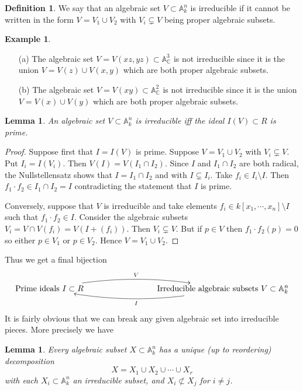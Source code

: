 \documentclass [12pt,oneside,a4paper,mathscr]{amsart}
\newtheorem{lemma}[thm]{Lemma}
\theoremstyle{definition}
\newtheorem{defn}[thm]{Definition}
\newtheorem{example}[thm]{Example}
\newcommand {\A}{\mathbb A}
\newcommand {\C}{\mathbb C}
\begin{document}
\begin{defn}We say that an algebraic set $V\subset \A^n_k$  is irreducible if it cannot be written in the form $V=V_1\cup V_2$ with $V_i\subsetneq V$ being proper algebraic subsets.\end{defn}


\begin{example}
\begin{itemize}
\item[(a)] The algebraic  set $V=V(xz,yz)\subset \A^3_\C$ is not irreducible since it is the union $V=V(z)\cup V(x,y)$ which are both proper algebraic subsets.\smallskip
\item[(b)] The algebraic set $V=V(xy)\subset \A^2_\C$ is not irreducible since it is the union $V=V(x)\cup V(y)$ which are both proper algebraic subsets.\smallskip
\end{itemize}
\end{example}

\begin{lemma}
An algebraic set $V\subset \A^n_k$ is irreducible iff the ideal $I(V)\subset R$ is prime.
\end{lemma}

\begin{proof}
Suppose first that $I=I(V)$ is prime. Suppose $V=V_1\cup V_2$ with $V_i\subsetneq V$. Put $I_i=I(V_i)$. Then $V(I)=V(I_1\cap I_2)$. Since $I$ and $I_1\cap I_2$ are both radical, the Nullstellensatz shows that $I=I_1\cap I_2$ and  with $I\subsetneq I_i$. 
 Take $f_i\in I_i\setminus I$. Then $f_1 \cdot f_2\in I_1\cap I_2=I$ contradicting the statement that $I$ is prime.

Conversely, suppose that $V$ is irreducible and take elements $f_i\in k[x_1,\cdots,x_n]\setminus  I$ such that $f_1\cdot f_2\in I$. Consider the algebraic subsets $V_i=V\cap V(f_i)=V(I+(f_i))$. Then $V_i\subsetneq V$. But if $p\in V$ then $f_1\cdot f_2(p)=0$ so either $p\in V_1$ or $p\in V_2$. Hence $V=V_1\cup V_2$. 
\end{proof}

Thus we get a final bijection
\[\xymatrix{ {\text{Prime ideals }I\subset R} \ar@/^1pc/[rrr]^{V} &&& {\text{Irreducible algebraic subsets }V\subset \A^n_k} \ar@/^1pc/[lll]^{I}}\]
It is fairly obvious that we can break any given algebraic set into irreducible pieces. More precisely we have

\begin{lemma} Every algebraic subset $X\subset \A^n_k$ has a unique (up to reordering)  decomposition
\[X=X_1 \cup X_2 \cup \cdots \cup X_r\]
with each $X_i\subset \A^n_k$ an irreducible subset, and $X_i\not\subset X_j$ for $i\neq j$.
\end{lemma}
\end{document}
